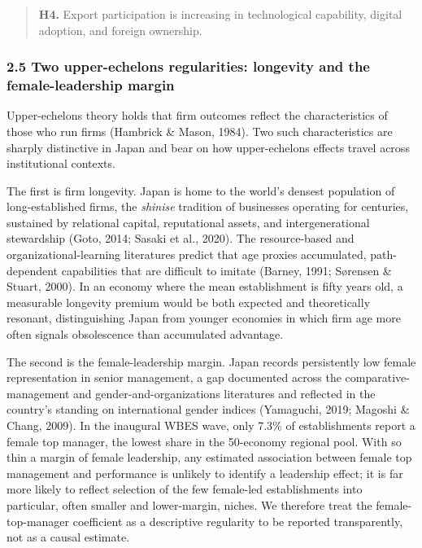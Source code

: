 \documentclass[
  12pt,a4paper]{article}
\begin{document}
\begin{quote}
\textbf{H4.} Export participation is increasing in technological
capability, digital adoption, and foreign ownership.
\end{quote}

\hypertarget{two-upper-echelons-regularities-longevity-and-the-female-leadership-margin}{%
\subsubsection{2.5 Two upper-echelons regularities: longevity and the
female-leadership
margin}\label{two-upper-echelons-regularities-longevity-and-the-female-leadership-margin}}

Upper-echelons theory holds that firm outcomes reflect the
characteristics of those who run firms (Hambrick \& Mason, 1984). Two
such characteristics are sharply distinctive in Japan and bear on how
upper-echelons effects travel across institutional contexts.

The first is firm longevity. Japan is home to the world's densest
population of long-established firms, the \emph{shinise} tradition of
businesses operating for centuries, sustained by relational capital,
reputational assets, and intergenerational stewardship (Goto, 2014;
Sasaki et al., 2020). The resource-based and organizational-learning
literatures predict that age proxies accumulated, path-dependent
capabilities that are difficult to imitate (Barney, 1991; Sørensen \&
Stuart, 2000). In an economy where the mean establishment is fifty years
old, a measurable longevity premium would be both expected and
theoretically resonant, distinguishing Japan from younger economies in
which firm age more often signals obsolescence than accumulated
advantage.

The second is the female-leadership margin. Japan records persistently
low female representation in senior management, a gap documented across
the comparative-management and gender-and-organizations literatures and
reflected in the country's standing on international gender indices
(Yamaguchi, 2019; Magoshi \& Chang, 2009). In the inaugural WBES wave,
only 7.3\% of establishments report a female top manager, the lowest
share in the 50-economy regional pool. With so thin a margin of female
leadership, any estimated association between female top management and
performance is unlikely to identify a leadership effect; it is far more
likely to reflect selection of the few female-led establishments into
particular, often smaller and lower-margin, niches. We therefore treat
the female-top-manager coefficient as a descriptive regularity to be
reported transparently, not as a causal estimate.
\end{document}
